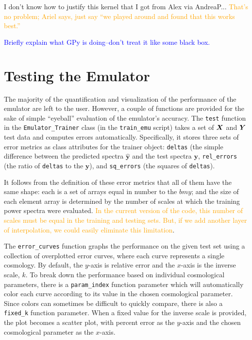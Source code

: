 I don't know how to justify this kernel that I got from Alex via AndreaP...
\textcolor{orange}{That's no problem; Ariel says, just say ``we played around
and found that this works best.''}

\textcolor{blue}{Briefly explain what GPy is doing--don’t treat it like some black box.}


\section{Testing the Emulator}
\label{test_emu}

The majority of the quantification and visualization of the performance of the
emulator are left to the user. However, a couple of functions are provided for 
the sake of simple ``eyeball'' evaluation of the emulator's accuracy.
The \verb|test| function in the \verb|Emulator_Trainer| class (in the
\verb|train_emu| script) takes a set of $\bm{X}$ and $\bm{Y}$ test data 
and computes errors automatically. Specifically, it stores three sets of error 
metrics as class attributes for the trainer object: \verb|deltas| (the simple 
difference between the predicted spectra $\hat{\bm{y}}$ and the test spectra
$\bm{y}$, \verb|rel_errors| (the ratio of \verb|deltas| to the $\bm{y}$), and
\verb|sq_errors| (the squares of \verb|deltas|).

It follows from the definition of these error metrics that all of them have 
the same shape: each is a set of arrays equal in number to the $bm{y}$; and 
the size of each element array is determined by the number of scales at which 
the training power spectra were evaluated. \textcolor{orange}{In the current
version of the code, this number of scales must be equal in the training and
testing sets. But, if we add another layer of interpolation, we could easily
eliminate this limitation}.

The \verb|error_curves| function graphs the performance on the given test set 
using a collection of overplotted error curves, where each curve represents a 
single cosmology. By default, the $y$-axis is relative error and the
$x$-axis is the inverse scale, $k$. To break down the performance based on 
individual cosmological parameters, there is a \verb|param_index| function
parameter which will automatically color each curve according to its value in 
the chosen cosmological parameter. Since colors can sometimes be difficult to 
quickly compare, there is also a \verb|fixed_k| function parameter. When a 
fixed value for the inverse scale is provided, the plot becomes a scatter 
plot, with percent error as the $y$-axis and the chosen cosmological parameter 
as the $x$-axis.


